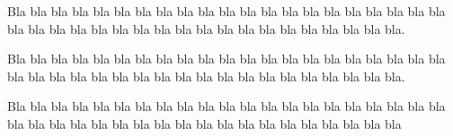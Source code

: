 \documentclass{article}
\begin{document}
Bla bla bla bla bla bla bla bla bla bla bla bla bla bla bla bla bla bla bla bla
bla bla bla bla bla bla bla bla bla bla bla bla bla bla bla bla bla bla bla bla.

\begin{center}
  \begin{pykzplotwidth}{\textwidth}
    
  \end{pykzplotwidth}
\end{center}

Bla bla bla bla bla bla bla bla bla bla bla bla bla bla bla bla bla bla bla bla bla bla bla bla bla bla bla bla bla bla bla bla bla bla bla bla bla bla bla bla.

\begin{center}
  
\end{center}

Bla bla bla bla bla bla bla bla bla bla bla bla bla bla bla bla bla bla bla bla
bla bla bla bla bla bla bla bla bla bla bla bla bla bla bla bla bla bla bla bla
\end{document}

